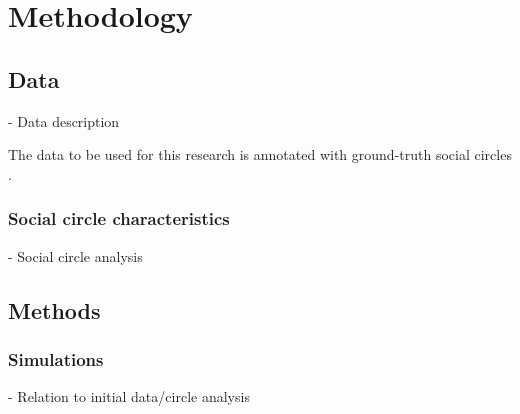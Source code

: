 \section{Methodology} \label{sec:meth}

\subsection{Data}





- Data description

The data to be used for this research is annotated with ground-truth social circles \cite{snapnets}.  


\subsubsection{Social circle characteristics\nopunct}\hfill \break
- Social circle analysis


\subsection{Methods}






\subsubsection{Simulations\nopunct}\hfill \break
- Relation to initial data/circle analysis

